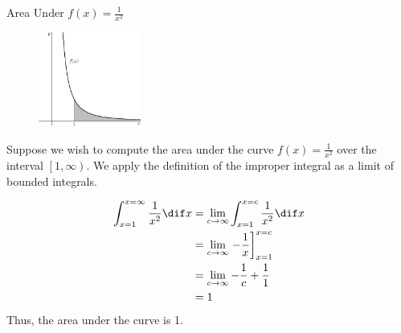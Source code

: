 \begin{example}{Area Under $f(x)=\frac{1}{x^2}$}

	\begin{figure}
    	\centering
		\includegraphics[width=0.3\textwidth]{ChapterGeom/Figures/AreaUnder1Overx2}
	\end{figure}

Suppose we wish to compute the area under the curve $f(x)=\frac{1}{x^2}$ over the interval $\left[1,\infty\right)$.  We apply the definition of the improper integral as a limit of bounded integrals.  

\begin{align*}
\int_{x=1}^{x=\infty}\frac{1}{x^2}\dif x &= \lim_{c \rightarrow \infty} \int_{x=1}^{x=c} \frac{1}{x^2} \dif x \\
&= \lim_{c \rightarrow \infty} \left.-\frac{1}{x} \right]_{x=1}^{x=c}\\
&= \lim_{c \rightarrow \infty} -\frac{1}{c}+\frac{1}{1} \\
&=1
\end{align*}
Thus, the area under the curve is 1.
\end{example}

